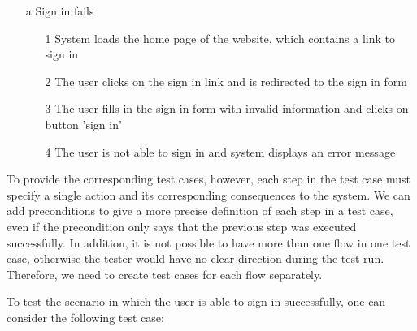 \begin{itemize}

\item[a] Sign in fails

\begin{itemize}

\item[1] System loads the home page of the website, which contains a link to sign in

\item[2] The user clicks on the sign in link and is redirected to the sign in form

\item[3] The user fills in the sign in form with invalid information and clicks on button 'sign in'

\item[4] The user is not able to sign in and system displays an error message
\end{itemize} 
\end{itemize}



To provide the corresponding test cases, however, each step in the test case must specify a single action and its corresponding consequences to the system. We can add preconditions to give a more precise definition of each step in a test case, even if the precondition only says that the previous step was executed successfully. In addition, it is not possible to have more than one flow in one test case, otherwise the tester would have no clear direction during the test run. Therefore, we need to create test cases for each flow separately.

To test the scenario in which the user is able to sign in successfully, one can consider the following test case:

